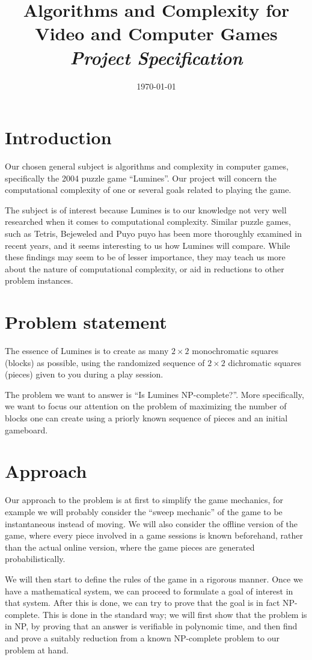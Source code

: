 \documentclass[a4paper,10pt]{article}
\title{Algorithms and Complexity for Video and Computer Games \\
    \textit{Project Specification}} %
\author{\cauthor} %
\date{\today} %
\begin{document}
\maketitle %

\section{Introduction}
Our chosen general subject is algorithms and complexity in computer games, specifically the 2004 puzzle game ``Lumines''. Our project will concern the computational complexity of one or several goals related to playing the game.

The subject is of interest because Lumines is to our knowledge not very well researched when it comes to computational complexity. Similar puzzle games, such as Tetris, Bejeweled and Puyo puyo has been more thoroughly examined in recent years, and it seems interesting to us how Lumines will compare. While these findings may seem to be of lesser importance, they may teach us more about the nature of computational complexity, or aid in reductions to other problem instances.

\section{Problem statement}
The essence of Lumines is to create as many $2 \times 2$ monochromatic squares (blocks) as possible, using the randomized sequence of $2 \times 2$ dichromatic squares (pieces) given to you during a play session.

The problem we want to answer is ``Is Lumines NP-complete?''. More specifically, we want to focus our attention on the problem of maximizing the number of blocks one can create using a priorly known sequence of pieces and an initial gameboard. 

\section{Approach}
Our approach to the problem is at first to simplify the game mechanics, for example we will probably consider the ``sweep mechanic'' of the game to be instantaneous instead of moving. We will also consider the offline version of the game, where every piece involved in a game sessions is known beforehand, rather than the actual online version, where the game pieces are generated probabilistically.

We will then start to define the rules of the game in a rigorous manner. Once we have a mathematical system, we can proceed to formulate a goal of interest in that system. After this is done, we can try to prove that the goal is in fact NP-complete. This is done in the standard way; we will first show that the problem is in NP, by proving that an answer is verifiable in polynomic time, and then find and prove a suitably reduction from a known NP-complete problem to our problem at hand.
\end{document}
